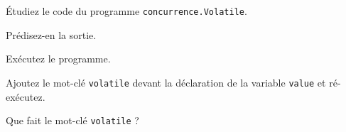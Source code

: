 
\begingroup

\begin{exercice}

  Étudiez le code du programme \texttt{concurrence.Volatile}.

  \begin{questions}
  \item Prédisez-en la sortie.
  \item Exécutez le programme.
  \item Ajoutez le mot-clé \texttt{volatile} devant
    la déclaration de la variable \lstinline{value} et ré-exécutez.
  \item Que fait le mot-clé \texttt{volatile} ?
  \end{questions}

\end{exercice}

\endgroup
\endinput
